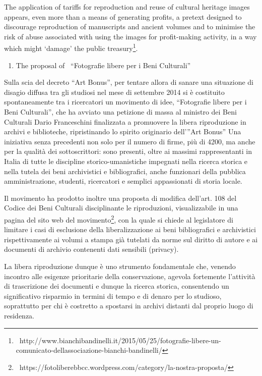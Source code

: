 \documentclass[amsthm,ebook]{saparticle}
\begin{document}
The application of tariffs for reproduction and reuse of cultural heritage images appears, even more than a means of
generating profits, a pretext designed to discourage reproduction of manuscripts and ancient volumes and to minimise
the risk of abuse associated with using the images for profit-making activity, in a way which might ‘damage’ the public
treasury\footnote{\ http://www.bianchibandinelli.it/2015/05/25/fotografie-libere-un-comunicato-dellassociazione-bianchi-bandinelli/}.


\bigskip


\bigskip

\begin{enumerate}
\item The proposal of \ “Fotografie libere per i Beni Culturali”
\end{enumerate}
Sulla scia del decreto “Art Bonus”, per tentare allora di sanare una situazione di disagio diffusa tra gli studiosi nel
mese di settembre 2014 si è costituito spontaneamente tra i ricercatori un movimento di idee, “Fotografie libere per i
Beni Culturali”, che ha avviato una petizione di massa al ministro dei Beni Culturali Dario Franceschini finalizzata a
promuovere la libera riproduzione in archivi e biblioteche, ripristinando lo spirito originario dell’”Art Bonus” Una
iniziativa senza precedenti non solo per il numero di firme, più di 4200, ma anche per la qualità dei sottoscrittori:
sono presenti, oltre ai massimi rappresentanti in Italia di tutte le discipline storico-umanistiche impegnati nella
ricerca storica e nella tutela dei beni archivistici e bibliografici, anche funzionari della pubblica amministrazione,
studenti, ricercatori e semplici appassionati di storia locale. 

Il movimento ha prodotto inoltre una proposta di modifica dell’art. 108 del Codice dei Beni Culturali disciplinante le
riproduzioni, visualizzabile in una pagina del sito web del
movimento\footnote{\ https://fotoliberebbcc.wordpress.com/category/la-nostra-proposta/}, con la quale si chiede al
legislatore di limitare i casi di esclusione della liberalizzazione ai beni bibliografici e archivistici
rispettivamente ai volumi a stampa già tutelati da norme sul diritto di autore e ai documenti di archivio contenenti
dati sensibili (privacy). 

La libera riproduzione dunque è uno strumento fondamentale che, venendo incontro alle esigenze prioritarie della
conservazione, agevola fortemente l’attività di trascrizione dei documenti e dunque la ricerca storica, consentendo un
significativo risparmio in termini di tempo e di denaro per lo studioso, soprattutto per chi è costretto a spostarsi in
archivi distanti dal proprio luogo di residenza. 
\end{document}
